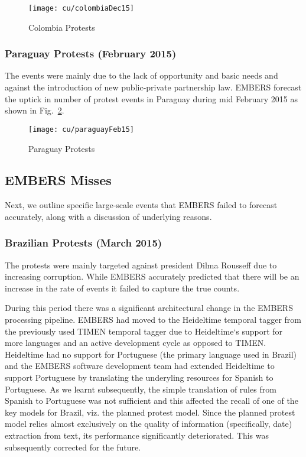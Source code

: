\begin{figure}[H]
\centering
\texttt{[image: cu/colombiaDec15]}
\caption{Colombia Protests }
\label{fig:colombiaDec14}
\end{figure}

\subsubsection*{Paraguay Protests (February 2015)}
The events were mainly due to the lack of opportunity and basic
needs and against the introduction of new public-private partnership law.
EMBERS forecast the uptick in number of protest events in Paraguay during mid
February 2015 as shown in Fig.~\ref{fig:paraguay15}. 

\begin{figure}[H]
\centering
\texttt{[image: cu/paraguayFeb15]}
\caption{Paraguay Protests }
\label{fig:paraguay15}
\end{figure}

\subsection{EMBERS Misses}
Next, we outline specific large-scale events that
EMBERS failed to forecast accurately, along with a discussion of underlying
reasons.

\subsubsection{Brazilian Protests (March 2015)}
The protests were mainly targeted against president Dilma Rousseff due to
increasing corruption. 
While EMBERS accurately predicted that there 
will be an increase in the rate of events it failed to
capture the true counts.

During this period there was a significant architectural change in the
EMBERS processing pipeline. EMBERS had moved to the Heideltime temporal
tagger from the previously used TIMEN temporal tagger due to
Heideltime`s support for more languages and an active development cycle as 
opposed to TIMEN. 
Heideltime had no support for Portuguese (the primary
language used in Brazil) and the EMBERS software development team had extended Heideltime to
support Portuguese by translating the underyling
resources for Spanish to Portuguese. As we learnt subsequently,
the simple translation of rules from Spanish to Portuguese
was not sufficient and this affected the recall of one of the key models
for Brazil, viz. the planned protest model. Since the planned protest model relies
almost exclusively on the quality of information (specifically, date) extraction from text,
its performance significantly deteriorated. This was subsequently corrected for the future.

